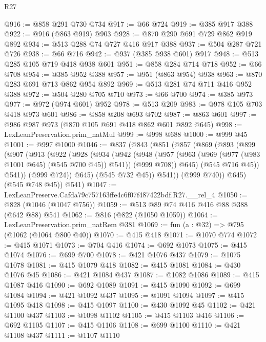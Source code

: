 \begin{lexlean}{R27}
\begin{coremodule}
@916 := @858 @291 @730 @734
@917 := @66 @724
@919 := @385 @917 @388
@922 := @916 (@863 @919) @903
@928 := @870 @290 @691 @729 @862 @919 @892
@934 := @513 @288 @74 @727 @416 @917 @388
@937 := @504 @287 @721 @726
@938 := @66 @716
@942 := @937 (@385 @938 @601) @917
@948 := @513 @285 @105 @719 @418 @938 @601
@951 := @858 @284 @714 @718
@952 := @66 @708
@954 := @385 @952 @388
@957 := @951 (@863 @954) @938
@963 := @870 @283 @691 @713 @862 @954 @892
@969 := @513 @281 @74 @711 @416 @952 @388
@972 := @504 @280 @705 @710
@973 := @66 @700
@974 := @385 @973
@977 := @972 (@974 @601) @952
@978 := @513 @209
@983 := @978 @105 @703 @418 @973 @601
@986 := @858 @208 @693 @702
@987 := @863 @601
@997 := @986 @987 @973 (@870 @105 @691 @418 @862 @601 @892 @645)
@998 := LexLeanPreservation.prim_natMul
@999 := @998 @688
@1000 := @999 @45
@1001 := @997 @1000
@1046 := @837
    (@843
      (@851
        (@857
          (@869
            (@893
              (@899
                (@907
                  (@913
                    (@922
                      (@928
                        (@934
                          (@942
                            (@948
                              (@957
                                (@963 (@969 (@977 (@983 @1001 @645) (@545 @700 @45)) @541))
                                (@999 @708))
                              @645)
                            (@545 @716 @45))
                          @541))
                      (@999 @724))
                    @645)
                  (@545 @732 @45))
                @541))
            (@999 @740))
          @645)
        (@545 @748 @45))
      @541)
@1047 := LexLeanPreserve.Cafda79c757163ffe4c6f07f487422bdf.R27.__rel_4
@1050 := @828 (@1046 (@1047 @756))
@1059 := @513 @89 @74 @416 @416 @88 @388 (@642 @88) @541
@1062 := @816 (@822 (@1050 @1059))
@1064 := LexLeanPreservation.prim_natRem @381
@1069 := fun (a : @32) => @795 (@1062 (@1064 @800 @40))
@1070 := @415 @418
@1071 := @1070 @774
@1072 := @415 @1071
@1073 := @704 @416
@1074 := @692 @1073
@1075 := @415 @1074
@1076 := @699 @700
@1078 := @421 @1076 @437
@1079 := @1075 @1078
@1081 := @415 @1079 @418
@1082 := @415 @1081
@1084 := @430 @1076 @45
@1086 := @421 @1084 @437
@1087 := @1082 @1086
@1089 := @415 @1087 @416
@1090 := @692 @1089
@1091 := @415 @1090
@1092 := @699 @1084
@1094 := @421 @1092 @437
@1095 := @1091 @1094
@1097 := @415 @1095 @418
@1098 := @415 @1097
@1100 := @430 @1092 @45
@1102 := @421 @1100 @437
@1103 := @1098 @1102
@1105 := @415 @1103 @416
@1106 := @692 @1105
@1107 := @415 @1106
@1108 := @699 @1100
@1110 := @421 @1108 @437
@1111 := @1107 @1110

\end{coremodule}
\end{lexlean}
